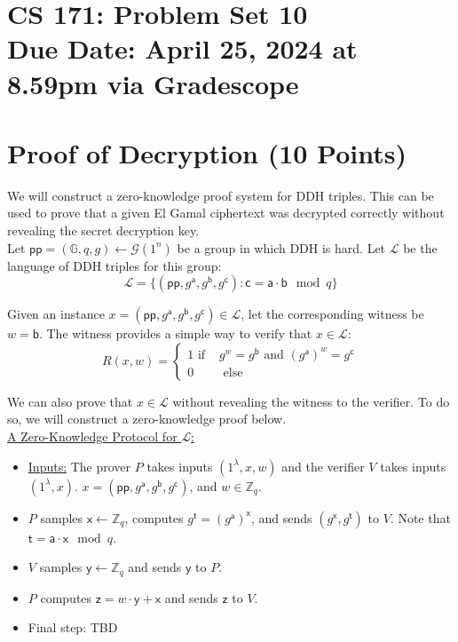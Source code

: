 \documentclass[11pt]{article}
\newcommand{\cL}{\mathcal{L}}
\newcommand{\GG}{\mathbb{G}}
\newcommand{\pp}{\mathsf{pp}}
\newcommand{\ZZ}{\mathbb{Z}}
\newcommand{\sfa}{\mathsf{a}}
\newcommand{\sfb}{\mathsf{b}}
\newcommand{\sfc}{\mathsf{c}}
\newcommand{\sft}{\mathsf{t}}
\newcommand{\sfx}{\mathsf{x}}
\newcommand{\sfy}{\mathsf{y}}
\newcommand{\sfz}{\mathsf{z}}
\newcommand{\secp}{\lambda}
\newcommand{\duedate}{April 25, 2024 at 8.59pm via Gradescope}
\numberwithin{equation}{section}
\begin{document}
\section*{CS 171: Problem Set 10\\ {\small Due Date: \duedate} }

\section{Proof of Decryption (10 Points)}
We will construct a zero-knowledge proof system for DDH triples. This can be used to prove that a given El Gamal ciphertext was decrypted correctly without revealing the secret decryption key.\\

Let $\pp = (\GG, q, g) \leftarrow \mathcal{G}(1^n)$ be a group in which DDH is hard. Let $\cL$ be the language of DDH triples for this group:
\[\cL = \{(\pp, g^\sfa, g^\sfb, g^\sfc) : \sfc = \sfa \cdot \sfb \mod q\}\]

Given an instance $x = (\pp, g^\sfa, g^\sfb, g^\sfc) \in \cL$, let the corresponding witness be $w = \sfb$. The witness provides a simple way to verify that $x \in \cL$:
\[R(x, w) = 
\begin{cases}
    1 \text{ if } & g^{w} = g^\sfb \text{ and } (g^\sfa)^w = g^{\sfc}\\
    0 & \text{ else }
\end{cases}\]

We can also prove that $x \in \cL$ without revealing the witness to the verifier. To do so, we will construct a zero-knowledge proof below.\\

\noindent\underline{A Zero-Knowledge Protocol for $\cL$:}
\begin{itemize}
    \item \underline{Inputs:} The prover $P$ takes inputs $(1^\secp, x, w)$ and the verifier $V$ takes inputs $(1^\secp, x)$. $x = (\pp, g^\sfa, g^\sfb, g^\sfc)$, and $w \in \ZZ_q$.
    \item $P$ samples $\sfx \leftarrow \ZZ_q$, computes $g^\sft = (g^\sfa)^\sfx$, and sends $(g^\sfx,g^{\sft})$ to $V$. Note that $\sft = \sfa \cdot \sfx \mod q$. 
    \item $V$ samples $\sfy \leftarrow \mathbb{Z}_q$ and sends $\sfy$ to $P$.
    \item $P$ computes $\sfz = w \cdot \sfy + \sfx$ and sends $\sfz$ to $V$.
    \item Final step: TBD
\end{itemize}
\end{document}
